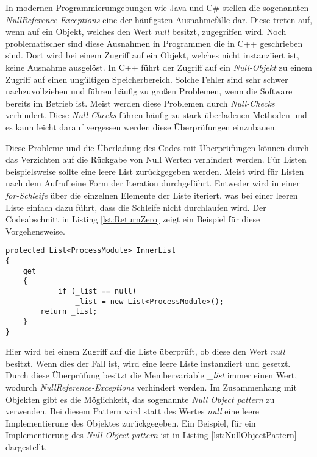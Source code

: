 \SuperPar In modernen Programmierumgebungen wie Java und C\# stellen die sogenannten \textit{NullReference-Exceptions} eine der häufigsten Ausnahmefälle dar. Diese treten auf, wenn auf ein Objekt, welches den Wert \textit{null} besitzt, zugegriffen wird. Noch problematischer sind diese Ausnahmen in Programmen die in C++ geschrieben sind. Dort wird bei einem Zugriff auf ein Objekt, welches nicht instanziiert ist, keine Ausnahme ausgelöst. In C++ führt der Zugriff auf ein \textit{Null-Objekt} zu einem Zugriff auf einen ungültigen Speicherbereich. Solche Fehler sind sehr schwer nachzuvollziehen und führen häufig zu großen Problemen, wenn die Software bereits im Betrieb ist. Meist werden diese Problemen durch \textit{Null-Checks} verhindert. Diese \textit{Null-Checks} führen häufig zu stark überladenen Methoden und es kann leicht darauf vergessen werden diese Überprüfungen einzubauen.

\SuperPar Diese Probleme und die Überladung des Codes mit Überprüfungen können durch das Verzichten auf die Rückgabe von Null Werten verhindert werden. Für Listen beispielsweise sollte eine leere List zurückgegeben werden. Meist wird für Listen nach dem Aufruf eine Form der Iteration durchgeführt. Entweder wird in einer \textit{for-Schleife} über die einzelnen Elemente der Liste iteriert, was bei einer leeren Liste einfach dazu führt, dass die Schleife nicht durchlaufen wird. Der Codeabschnitt in Listing \ref{lst:ReturnZero} zeigt ein Beispiel für diese Vorgehensweise.

\begin{lstlisting}[language={[Sharp]C}, caption=Beispiel für Rückgabe einer leeren Liste statt eines Null Wertes, label=lst:ReturnZero]
protected List<ProcessModule> InnerList
{
	get
	{
			if (_list == null)
				_list = new List<ProcessModule>();
		return _list;
	}
}
\end{lstlisting}

\SuperPar Hier wird bei einem Zugriff auf die Liste überprüft, ob diese den Wert \textit{null} besitzt. Wenn dies der Fall ist, wird eine leere Liste instanziiert und gesetzt. Durch diese Überprüfung besitzt die Membervariable \textit{\_list} immer einen Wert, wodurch \textit{NullReference-Exceptions} verhindert werden. Im Zusammenhang mit Objekten gibt es die Möglichkeit, das sogenannte \textit{Null Object pattern} \cite{Martin1997} zu verwenden. Bei diesem Pattern wird statt des Wertes \textit{null} eine leere Implementierung des Objektes zurückgegeben. Ein Beispiel, für ein Implementierung des \textit{Null Object pattern} ist in Listing \ref{lst:NullObjectPattern} dargestellt.

